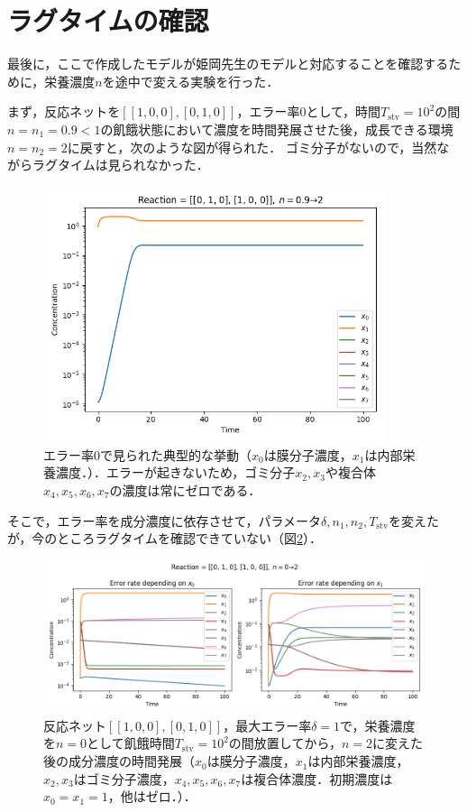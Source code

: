 \documentclass[a4paper,11pt]{jsarticle}
\begin{document}
\section{ラグタイムの確認}
最後に，ここで作成したモデルが姫岡先生のモデルと対応することを確認するために，栄養濃度$n$を途中で変える実験を行った．

まず，反応ネットを$[[1,0,0],[0,1,0]]$，エラー率0として，時間$T_{\mathrm{stv}}=10^2$の間$n=n_1=0.9<1$の飢餓状態において濃度を時間発展させた後，成長できる環境$n=n_2=2$に戻すと，次のような図が得られた．
ゴミ分子がないので，当然ながらラグタイムは見られなかった．

\begin{figure}[htbp]
  \centering
  \includegraphics[width=10cm]{waste_err0_lag_T2_n09to2.png}
  \caption{エラー率0で見られた典型的な挙動（$x_0$は膜分子濃度，$x_1$は内部栄養濃度．）．エラーが起きないため，ゴミ分子$x_2,x_3$や複合体$x_4,x_5,x_6,x_7$の濃度は常にゼロである．}
  \label{fig:err0_lag}
\end{figure}

そこで，エラー率を成分濃度に依存させて，パラメータ$\delta,n_1,n_2,T_{\mathrm{stv}}$を変えたが，今のところラグタイムを確認できていない（図\ref{fig:err1_lag}）．

\begin{figure}[htbp]
  \centering
  \includegraphics[width=\columnwidth]{waste_errslp1_lag_T2_n0to2.png}
  \caption{反応ネット$[[1,0,0],[0,1,0]]$，最大エラー率$\delta=1$で，栄養濃度を$n=0$として飢餓時間$T_{\mathrm{stv}}=10^2$の間放置してから，$n=2$に変えた後の成分濃度の時間発展（$x_0$は膜分子濃度，$x_1$は内部栄養濃度，$x_2,x_3$はゴミ分子濃度，$x_4,x_5,x_6,x_7$は複合体濃度．初期濃度は$x_0=x_1=1$，他はゼロ．）．}
  \label{fig:err1_lag}
\end{figure}
\end{document}
